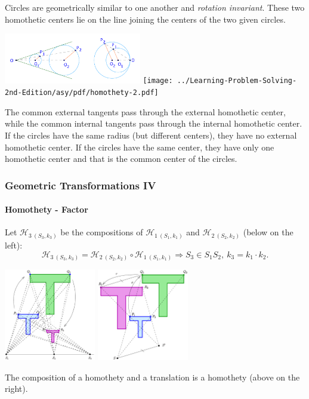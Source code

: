 \documentclass[8pt,xcolor=table,dvipsnames]{beamer}
\begin{document}
\begin{frame}[t]
\begin{overprint}
\begin{center}
        \end{center}
        Circles are geometrically similar to one another and \textit{rotation invariant}.
        These two homothetic centers lie on the line joining the centers of the two given circles.
        \begin{center}
            \includegraphics[width=6cm]{./svg/pdf/homothety-circles.pdf}
            \texttt{[image: ../Learning-Problem-Solving-2nd-Edition/asy/pdf/homothety-2.pdf]}
        \end{center}
        The common external tangents pass through the external homothetic center,
        while the common internal tangents pass through the internal homothetic center.
        \bigbreak
        If the circles have the same radius (but different centers), they have no external homothetic center.
        If the circles have the same center, they have only one homothetic center and that is the common center of the circles.
    \end{overprint}
\end{frame}

\begin{frame}[t]
    \frametitle{Geometric Transformations IV}
    \framesubtitle{Homothety - Factor}
    Let $\mathcal{H}_{3\ (S_3,k_3)}$ be the compositions of $\mathcal{H}_{1\ (S_1,k_1)}$
    and $\mathcal{H}_{2\ (S_2,k_2)}$ (below on the left): 
    \[
        \mathcal{H}_{3\ (S_3,k_3)} = \mathcal{H}_{2\ (S_2,k_2)} \circ \mathcal{H}_{1\ (S_1,k_1)}
        \Rightarrow S_3 \in S_1S_2,\ k_3=k_1 \cdot k_2.
    \]
    \begin{center}
        \includegraphics[width=4cm]{./svg/pdf/Zentr-streck-TT-e.pdf}
        \qquad \qquad
        \includegraphics[width=4cm]{./svg/pdf/Zentr-streck-T-st-e.pdf}
    \end{center}
    The composition of a homothety and a translation is a homothety (above on the right).
\end{frame}
\end{document}
